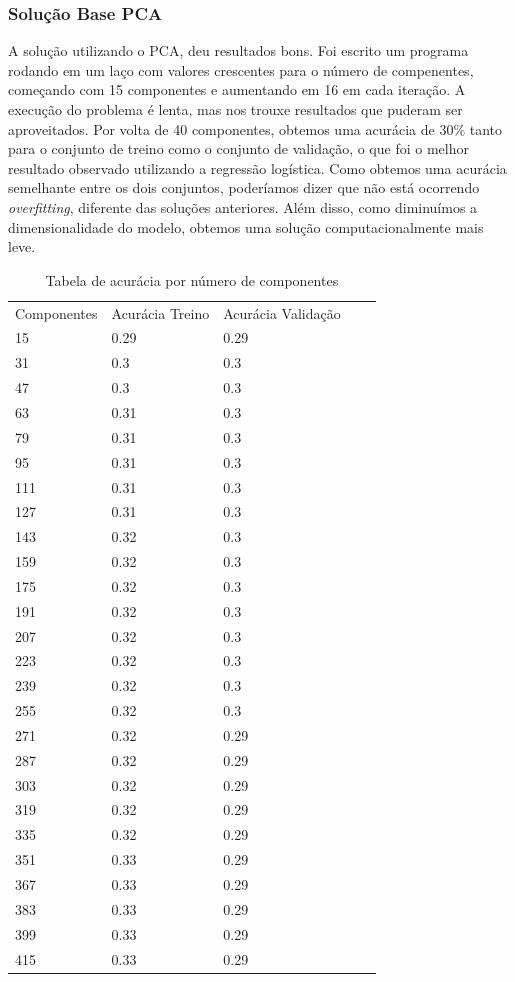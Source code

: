 \documentclass[conference]{IEEEtran}
\begin{document}
\subsubsection{Solução Base PCA}
A solução utilizando o PCA, deu resultados bons. Foi escrito um programa rodando em um laço com valores crescentes para o número de compenentes, começando com 15 componentes e aumentando em 16 em cada iteração. A execução do problema é lenta, mas nos trouxe resultados que puderam ser aproveitados. Por volta de 40 componentes, obtemos uma acurácia de 30\% tanto para o conjunto de treino como o conjunto de validação, o que foi o melhor resultado observado utilizando a regressão logística. Como obtemos uma acurácia semelhante entre os dois conjuntos, poderíamos dizer que não está ocorrendo \textit{overfitting}, diferente das soluções anteriores. Além disso, como diminuímos a dimensionalidade do modelo, obtemos uma solução computacionalmente mais leve.

\begin{table}[H]
\centering
\caption{Tabela de acurácia por número de componentes}
\label{my-label}
\begin{tabular}{lllll}
Componentes & Acurácia Treino & Acurácia Validação & & \\
15  & 0.29 & 0.29 &  &  \\
31  & 0.3  & 0.3  &  &  \\
47  & 0.3  & 0.3  &  &  \\
63  & 0.31 & 0.3  &  &  \\
79  & 0.31 & 0.3  &  &  \\
95  & 0.31 & 0.3  &  &  \\
111 & 0.31 & 0.3  &  &  \\
127 & 0.31 & 0.3  &  &  \\
143 & 0.32 & 0.3  &  &  \\
159 & 0.32 & 0.3  &  &  \\
175 & 0.32 & 0.3  &  &  \\
191 & 0.32 & 0.3  &  &  \\
207 & 0.32 & 0.3  &  &  \\
223 & 0.32 & 0.3  &  &  \\
239 & 0.32 & 0.3  &  &  \\
255 & 0.32 & 0.3  &  &  \\
271 & 0.32 & 0.29 &  &  \\
287 & 0.32 & 0.29 &  &  \\
303 & 0.32 & 0.29 &  &  \\
319 & 0.32 & 0.29 &  &  \\
335 & 0.32 & 0.29 &  &  \\
351 & 0.33 & 0.29 &  &  \\
367 & 0.33 & 0.29 &  &  \\
383 & 0.33 & 0.29 &  &  \\
399 & 0.33 & 0.29 &  &  \\
415 & 0.33 & 0.29 &  & 
\end{tabular}
\end{table}
\end{document}
